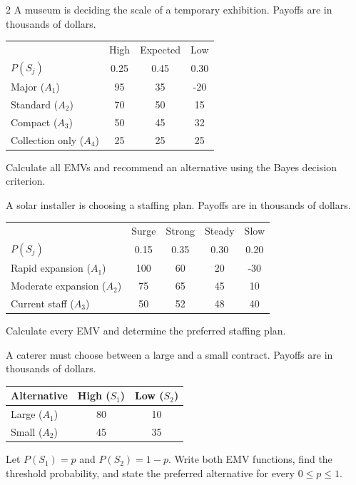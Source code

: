 \begin{multicols}{2}
		A museum is deciding the scale of a temporary exhibition. Payoffs are in thousands of dollars.
		\begin{center}\scriptsize\setlength{\tabcolsep}{2pt}\renewcommand{\arraystretch}{1.15}
			\begin{tabular}{lccc}\toprule
			&High&Expected&Low\\
			$P(S_j)$&0.25&0.45&0.30\\ \midrule
			Major ($A_1$)&95&35&-20\\
			Standard ($A_2$)&70&50&15\\
			Compact ($A_3$)&50&45&32\\
			Collection only ($A_4$)&25&25&25\\ \bottomrule
			\end{tabular}
		\end{center}
		Calculate all EMVs and recommend an alternative using the Bayes decision criterion.

		A solar installer is choosing a staffing plan. Payoffs are in thousands of dollars.
		\begin{center}\scriptsize\setlength{\tabcolsep}{1.5pt}\renewcommand{\arraystretch}{1.15}
			\begin{tabular}{lcccc}\toprule
			&Surge&Strong&Steady&Slow\\
			$P(S_j)$&0.15&0.35&0.30&0.20\\ \midrule
			Rapid expansion ($A_1$)&100&60&20&-30\\
			Moderate expansion ($A_2$)&75&65&45&10\\
			Current staff ($A_3$)&50&52&48&40\\ \bottomrule
			\end{tabular}
		\end{center}
		Calculate every EMV and determine the preferred staffing plan.

		A caterer must choose between a large and a small contract. Payoffs are in thousands of dollars.
		\begin{center}\small\setlength{\tabcolsep}{4pt}\renewcommand{\arraystretch}{1.15}
			\begin{tabular}{lcc}\toprule
			Alternative&High ($S_1$)&Low ($S_2$)\\ \midrule
			Large ($A_1$)&80&10\\
			Small ($A_2$)&45&35\\ \bottomrule
			\end{tabular}
		\end{center}
		Let $P(S_1)=p$ and $P(S_2)=1-p$. Write both EMV functions, find the threshold probability, and state the preferred alternative for every $0\le p\le1$.


\end{multicols}
